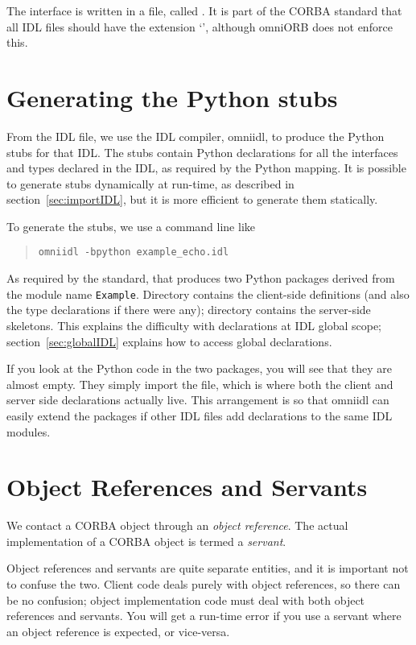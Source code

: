 \documentclass[11pt,oneside,a4paper]{book}
\newcommand{\module}[1]{\texttt{#1}}
\newcommand{\cmdline}[1]{\texttt{#1}}
\newcommand{\term}[1]{\textit{#1}}
\begin{document}
The interface is written in a file, called . It
is part of the CORBA standard that all IDL files should have the
extension `', although omniORB does not enforce this.


\section{Generating the Python stubs}
\label{sec:generatingStubs}

From the IDL file, we use the IDL compiler, omniidl, to produce the
Python stubs for that IDL. The stubs contain Python declarations for
all the interfaces and types declared in the IDL, as required by the
Python mapping. It is possible to generate stubs dynamically at
run-time, as described in section~\ref{sec:importIDL}, but it is more
efficient to generate them statically.

To generate the stubs, we use a command line like

\begin{quote}
\cmdline{omniidl -bpython example\_echo.idl}
\end{quote}

\noindent As required by the standard, that produces two Python
packages derived from the module name \module{Example}. Directory
 contains the client-side definitions (and also the type
declarations if there were any); directory 
contains the server-side skeletons. This explains the difficulty with
declarations at IDL global scope; section~\ref{sec:globalIDL} explains
how to access global declarations.

If you look at the Python code in the two packages, you will see that
they are almost empty. They simply import the
 file, which is where both the client and
server side declarations actually live. This arrangement is so that
omniidl can easily extend the packages if other IDL files add
declarations to the same IDL modules.


\section{Object References and Servants}

We contact a CORBA object through an \term{object reference}. The
actual implementation of a CORBA object is termed a \term{servant}.

Object references and servants are quite separate entities, and it is
important not to confuse the two. Client code deals purely with object
references, so there can be no confusion; object implementation code
must deal with both object references and servants. You will get a
run-time error if you use a servant where an object reference is
expected, or vice-versa.
\end{document}
